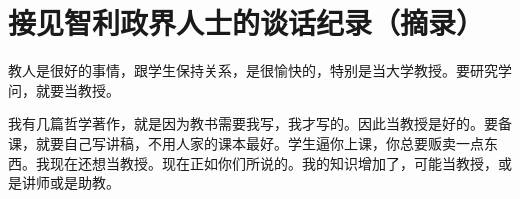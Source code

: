 \section[接见智利政界人士的谈话纪录（摘录）（一九五九年五月十五日）]{接见智利政界人士的谈话纪录（摘录）}


教人是很好的事情，跟学生保持关系，是很愉快的，特别是当大学教授。要研究学问，就要当教授。

我有几篇哲学著作，就是因为教书需要我写，我才写的。因此当教授是好的。要备课，就要自己写讲稿，不用人家的课本最好。学生逼你上课，你总要贩卖一点东西。我现在还想当教授。现在正如你们所说的。我的知识增加了，可能当教授，或是讲师或是助教。


